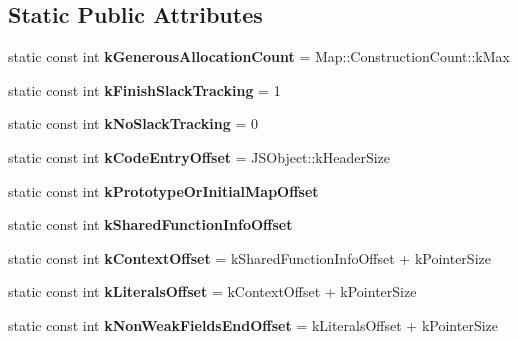 \subsection*{Static Public Attributes}
\begin{DoxyCompactItemize}
\item 
\hypertarget{classv8_1_1internal_1_1_j_s_function_a9f0157bb2a5d435ab3129f3b75ad217f}{}static const int {\bfseries k\+Generous\+Allocation\+Count} = Map\+::\+Construction\+Count\+::k\+Max\label{classv8_1_1internal_1_1_j_s_function_a9f0157bb2a5d435ab3129f3b75ad217f}

\item 
\hypertarget{classv8_1_1internal_1_1_j_s_function_ae59c9366ba6a0ae20383b7f084419e07}{}static const int {\bfseries k\+Finish\+Slack\+Tracking} = 1\label{classv8_1_1internal_1_1_j_s_function_ae59c9366ba6a0ae20383b7f084419e07}

\item 
\hypertarget{classv8_1_1internal_1_1_j_s_function_ab6b3332b17e4a82705f437f386d70c74}{}static const int {\bfseries k\+No\+Slack\+Tracking} = 0\label{classv8_1_1internal_1_1_j_s_function_ab6b3332b17e4a82705f437f386d70c74}

\item 
\hypertarget{classv8_1_1internal_1_1_j_s_function_afe3d93b66114f229c8738d1125b5eb6a}{}static const int {\bfseries k\+Code\+Entry\+Offset} = J\+S\+Object\+::k\+Header\+Size\label{classv8_1_1internal_1_1_j_s_function_afe3d93b66114f229c8738d1125b5eb6a}

\item 
static const int {\bfseries k\+Prototype\+Or\+Initial\+Map\+Offset}
\item 
static const int {\bfseries k\+Shared\+Function\+Info\+Offset}
\item 
\hypertarget{classv8_1_1internal_1_1_j_s_function_ade0e7f9373960a4a7b06e51844f26b3e}{}static const int {\bfseries k\+Context\+Offset} = k\+Shared\+Function\+Info\+Offset + k\+Pointer\+Size\label{classv8_1_1internal_1_1_j_s_function_ade0e7f9373960a4a7b06e51844f26b3e}

\item 
\hypertarget{classv8_1_1internal_1_1_j_s_function_af655e87ac2a3d32ffcb06f07280025e7}{}static const int {\bfseries k\+Literals\+Offset} = k\+Context\+Offset + k\+Pointer\+Size\label{classv8_1_1internal_1_1_j_s_function_af655e87ac2a3d32ffcb06f07280025e7}

\item 
\hypertarget{classv8_1_1internal_1_1_j_s_function_a9264dbf979bcf14612c05ea1508773d1}{}static const int {\bfseries k\+Non\+Weak\+Fields\+End\+Offset} = k\+Literals\+Offset + k\+Pointer\+Size\label{classv8_1_1internal_1_1_j_s_function_a9264dbf979bcf14612c05ea1508773d1}


\end{DoxyCompactItemize}
